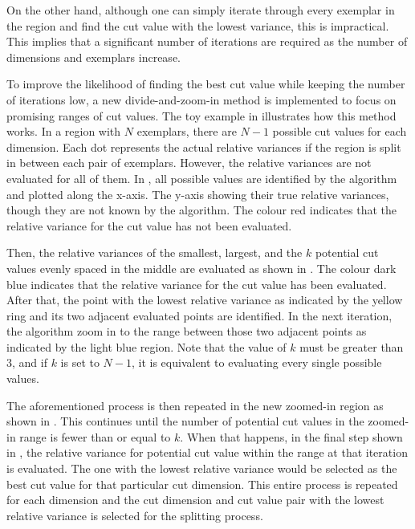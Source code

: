 On the other hand, although one can simply iterate through every exemplar in the region and find the cut value with the lowest variance, this is impractical. This implies that a significant number of iterations are required as the number of dimensions and exemplars increase. 

To improve the likelihood of finding the best cut value while keeping the number of iterations low, a new divide-and-zoom-in method is implemented to focus on promising ranges of cut values. The toy example in  illustrates how this method works. In a region with $N$ exemplars, there are $N-1$ possible cut values for each dimension. Each dot represents the actual relative variances if the region is split in between each pair of exemplars. However, the relative variances are not evaluated for all of them. In , all possible values are identified by the algorithm and plotted along the x-axis. The y-axis showing their true relative variances, though they are not known by the algorithm. The colour red indicates that the relative variance for the cut value has not been evaluated. 

Then, the relative variances of the smallest, largest, and the $k$ potential cut values evenly spaced in the middle are evaluated as shown in . The colour dark blue indicates that the relative variance for the cut value has been evaluated. After that, the point with the lowest relative variance as indicated by the yellow ring and its two adjacent evaluated points are identified. In the next iteration, the algorithm zoom in to the range between those two adjacent points as indicated by the light blue region. Note that the value of $k$ must be greater than 3, and if $k$ is set to $N-1$, it is equivalent to evaluating every single possible values. 

The aforementioned process is then repeated in the new zoomed-in region as shown in . This continues until the number of potential cut values in the zoomed-in range is fewer than or equal to $k$. When that happens, in the final step shown in , the relative variance for potential cut value within the range at that iteration is evaluated. The one with the lowest relative variance would be selected as the best cut value for that particular cut dimension. 
This entire process is repeated for each dimension and the cut dimension and cut value pair with the lowest relative variance is selected for the splitting process.


